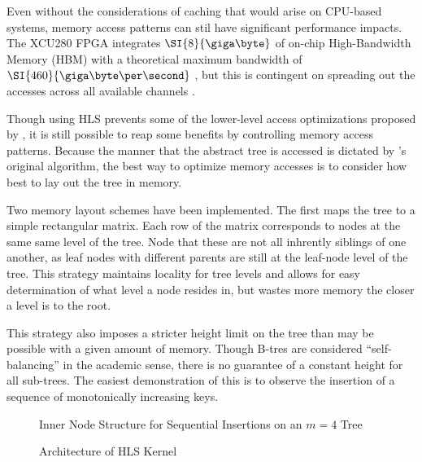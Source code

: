 \begin{figure}[H]
	\centering
	
\end{figure}

\begin{figure}[H]
	\centering
	
\end{figure}



Even without the considerations of caching that would arise on CPU-based
systems, memory access patterns can stil have significant performance impacts.
The XCU280 FPGA integrates $\SI{8}{\giga\byte}$ of on-chip High-Bandwidth Memory
(HBM) with a theoretical maximum bandwidth of $\SI{460}{\giga\byte\per\second}$
\autocite{u280}, but this is contingent on spreading out the accesses across all
available channels \autocite{holzinger-ipdpsw-2021}.

Though using HLS prevents some of the lower-level access optimizations proposed
by \citeauthor{holzinger-ipdpsw-2021}, it is still possible to reap some
benefits by controlling memory access patterns. Because the manner that the
abstract tree is accessed is dictated by \citeauthor{b-link}'s original
algorithm, the best way to optimize memory accesses is to consider how best to
lay out the tree in memory.


\begin{figure}[H]
	\centering
	
\end{figure}

Two memory layout schemes have been implemented. The first maps the tree to a
simple rectangular matrix. Each row of the matrix corresponds to nodes at the
same same level of the tree. Node that these are not all inhrently siblings of
one another, as leaf nodes with different parents are still at the leaf-node
level of the tree. This strategy maintains locality for tree levels and allows
for easy determination of what level a node resides in, but wastes more memory
the closer a level is to the root.

This strategy also imposes a stricter height limit on the tree than may be
possible with a given amount of memory. Though B-tres are considered
``self-balancing'' in the academic sense, there is no guarantee of a constant
height for all sub-trees. The easiest demonstration of this is to observe the
insertion of a sequence of monotonically increasing keys.

\begin{figure}[H]
	\centering
	
	\caption{Inner Node Structure for Sequential Insertions on an $m=4$ Tree}
\end{figure}



\begin{figure}[H]
	\centering
	
	\caption{Architecture of HLS Kernel}
\end{figure}
